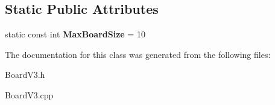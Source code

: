 \subsection*{Static Public Attributes}
\begin{DoxyCompactItemize}
\item 
static const int {\bfseries Max\+Board\+Size} = 10\hypertarget{classBoardV3_a1a30829ce2a600dff548d1122405a4ac}{}\label{classBoardV3_a1a30829ce2a600dff548d1122405a4ac}

\end{DoxyCompactItemize}


The documentation for this class was generated from the following files\+:\begin{DoxyCompactItemize}
\item 
Board\+V3.\+h\item 
Board\+V3.\+cpp\end{DoxyCompactItemize}
